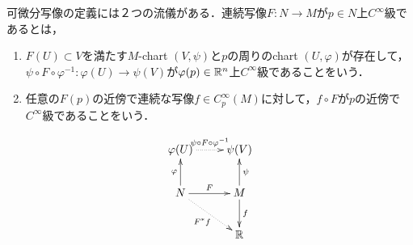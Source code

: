 \documentclass[uplatex,dvipdfmx]{jsreport}
\begin{document}
\begin{definition}
    可微分写像の定義には２つの流儀がある．連続写像$F:N\to M$が$p\in N$上$C^\infty$級であるとは，
    \begin{enumerate}
        \item $F(U)\subset V$を満たす$M$-chart $(V,\psi)$と$p$の周りのchart $(U,\varphi)$が存在して，
        $\psi\circ F\circ\varphi^{-1}:\varphi(U)\to\psi(V)$が$\varphi(p)\in\mathbb{R}^n$上$C^\infty$級であることをいう．
        \item 任意の$F(p)$の近傍で連続な写像$f\in C^\infty_p(M)$に対して，$f\circ F$が$p$の近傍で$C^\infty$級であることをいう．
    \end{enumerate}
    \[\xymatrix{
        \varphi(U)\ar@{.>}[r]^-{\psi\circ F\circ\varphi^{-1}}&\psi(V)\\
        N\ar[u]^-{\varphi}\ar[r]^-F\ar@{.>}[dr]_-{F^*f}&M\ar[u]_-{\psi}\ar[d]^-f\\
        &\R
    }\]
\end{definition}
\end{document}
